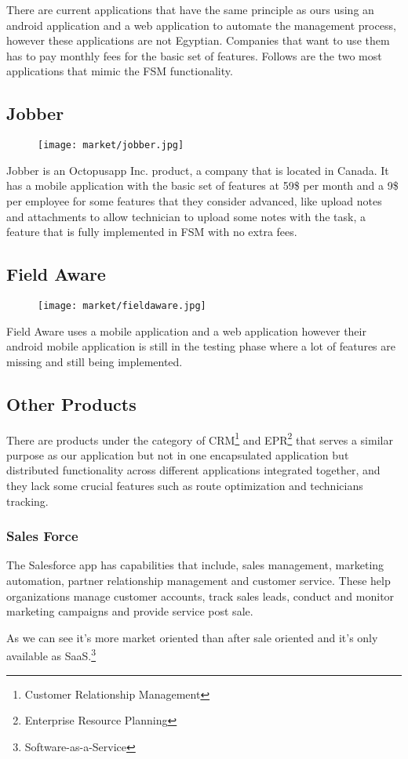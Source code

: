 There are current applications that have the same principle as ours using an android application and a web application to automate the management process, however these applications are not Egyptian. Companies that want to use them has to pay monthly fees for the basic set of features. Follows are the two most applications that mimic the FSM functionality.

\subsection{Jobber}
	\begin{figure}[ht]
		\centering
		\texttt{[image: market/jobber.jpg]}
	\end{figure}
	Jobber is an Octopusapp Inc. product, a company that is located in Canada. It has a mobile application with the basic set of features at 59\$ per month and a 9\$ per employee for some features that they consider advanced, like upload notes and attachments to allow technician to upload some notes with the task, a feature that is fully implemented in FSM with no extra fees.
\subsection{Field Aware}
	\begin{figure}[ht]
		\centering
		\texttt{[image: market/fieldaware.jpg]}
	\end{figure}
	Field Aware uses a mobile application and a web application however their android mobile application is still in the testing phase where a lot of features are missing and still being implemented.

\subsection{Other Products}
	There are products under the category of CRM\footnote{Customer Relationship Management} and EPR\footnote{Enterprise Resource Planning} that serves a similar purpose as our application but not in one encapsulated application but distributed functionality across different applications integrated together, and they lack some crucial features such as route optimization and technicians tracking.
	\subsubsection{Sales Force}
		The Salesforce app has capabilities that include, sales management, marketing automation, partner relationship management and customer service. These help organizations manage customer accounts, track sales leads, conduct and monitor marketing campaigns and provide service post sale.
		
		As we can see it's more market oriented than after sale oriented and it's only available as SaaS.\footnote{Software-as-a-Service}